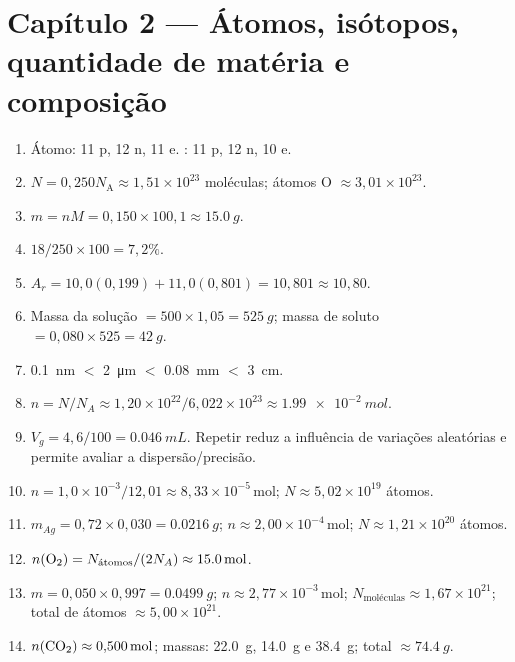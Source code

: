 \documentclass[11pt,a4paper,oneside]{book}
\newcommand{\NA}{N_{\mathrm A}}
\begin{document}
\section*{Capítulo 2 — Átomos, isótopos, quantidade de matéria e composição}
\begin{enumerate}
  \item Átomo: 11 p, 12 n, 11 e. : 11 p, 12 n, 10 e.
  \item $N=0{,}250\NA\approx1{,}51\times10^{23}$ moléculas; átomos O $\approx3{,}01\times10^{23}$.
  \item $m=nM=0{,}150\times100{,}1\approx\SI{15.0}{g}$.
  \item $18/250\times100=7{,}2\%$.
  \item $A_r=10{,}0(0{,}199)+11{,}0(0{,}801)=10{,}801\approx10{,}80$.
  \item Massa da solução $=500\times1{,}05=\SI{525}{g}$; massa de soluto $=0{,}080\times525=\SI{42}{g}$.
  \item \SI{0.1}{nm} $<$ \SI{2}{\micro m} $<$ \SI{0.08}{mm} $<$ \SI{3}{cm}.
  \item $n=N/N_A\approx1{,}20\times10^{22}/6{,}022\times10^{23}\approx\SI{1.99e-2}{mol}$.
  \item $V_g=4{,}6/100=\SI{0.046}{mL}$. Repetir reduz a influência de variações aleatórias e permite avaliar a dispersão/precisão.
  \item $n=1{,}0\times10^{-3}/12{,}01\approx8{,}33\times10^{-5}\,\mathrm{mol}$; $N\approx5{,}02\times10^{19}$ átomos.
  \item $m_{Ag}=0{,}72\times0{,}030=\SI{0.0216}{g}$; $n\approx2{,}00\times10^{-4}\,\mathrm{mol}$; $N\approx1{,}21\times10^{20}$ átomos.
  \item $n(\ce{O2})=N_{\text{átomos}}/(2N_A)\approx\SI{15.0}{mol}$.
  \item $m=0{,}050\times0{,}997=\SI{0.0499}{g}$; $n\approx2{,}77\times10^{-3}\,\mathrm{mol}$; $N_{\text{moléculas}}\approx1{,}67\times10^{21}$; total de átomos $\approx5{,}00\times10^{21}$.
  \item $n(\ce{CO2})\approx0{,}500\,\mathrm{mol}$; massas: \SI{22.0}{g}, \SI{14.0}{g} e \SI{38.4}{g}; total $\approx\SI{74.4}{g}$.
\end{enumerate}
\end{document}
